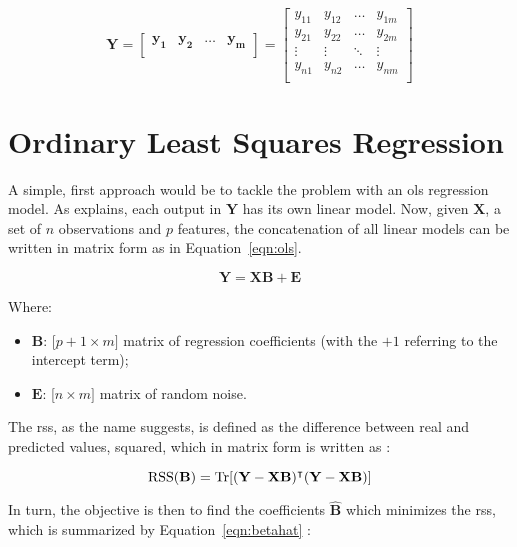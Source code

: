 \begin{equation*}
	\mathbf{Y} = 
	\begin{bmatrix}
		\mathbf{y_1} & \mathbf{y_2} &\dots &\mathbf{y_m}\\
	\end{bmatrix} 
	=
	\begin{bmatrix}
		
		y_{11} & y_{12} & \dots & y_{1m}\\
		y_{21} & y_{22} & \dots & y_{2m}\\
		\vdots  & \vdots & \ddots &\vdots\\
		y_{n1} & y_{n2} & \dots & y_{nm}\\
	\end{bmatrix}
\end{equation*}

\section{Ordinary Least Squares Regression}
\label{sec:linreg}

A simple, first approach would be to tackle the problem with an \acrfull{ols} regression model. As \cite{friedman2001} explains, each output in  $\mathbf{Y}$ has its own linear model. Now, given $\mathbf{X}$, a set of $n$ observations  and $p$ features,  the concatenation of all linear models can be written in matrix form as in Equation~\ref{eqn:ols}.

\begin{equation}
	\label{eqn:ols}
	\mathbf{Y = XB +  E}
\end{equation}

Where:
\begin{itemize}
	\item $\mathbf{B}$: [$p+1 \times m]$ matrix of regression coefficients (with the $+1$ referring to the intercept term);
	\item $\mathbf{E}$: [$n \times m]$ matrix of random noise.
\end{itemize}

The \acrfull{rss}, as the name suggests, is defined as the difference between real and predicted values, squared, which in matrix form is written as \parencite{friedman2001}:

\begin{equation} 
	\label{eqn:rss}
	\text{RSS}(\mathbf{B}) = \operatorname{Tr} [\mathbf{(Y-XB)^\intercal (Y-XB)}]
\end{equation}

In turn, the objective is then to find the coefficients $\mathbf{\hat{B}}$ which minimizes the \acrshort{rss}, which is summarized by Equation~\ref{eqn:betahat} \parencite{friedman2001}:

